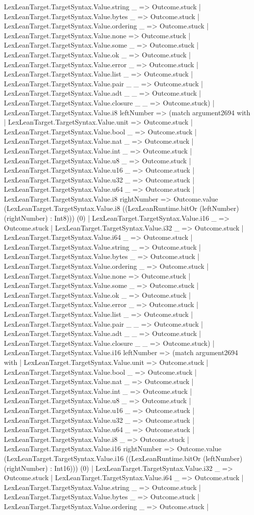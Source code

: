 \documentclass[11pt]{article}
\begin{document}
LexLeanTarget.TargetSyntax.Value.string \_ => Outcome.stuck | LexLeanTarget.TargetSyntax.Value.bytes \_ => Outcome.stuck | LexLeanTarget.TargetSyntax.Value.ordering \_ => Outcome.stuck | LexLeanTarget.TargetSyntax.Value.none => Outcome.stuck | LexLeanTarget.TargetSyntax.Value.some \_ => Outcome.stuck | LexLeanTarget.TargetSyntax.Value.ok \_ => Outcome.stuck | LexLeanTarget.TargetSyntax.Value.error \_ => Outcome.stuck | LexLeanTarget.TargetSyntax.Value.list \_ => Outcome.stuck | LexLeanTarget.TargetSyntax.Value.pair \_ \_ => Outcome.stuck | LexLeanTarget.TargetSyntax.Value.adt \_ \_ => Outcome.stuck | LexLeanTarget.TargetSyntax.Value.closure \_ \_ => Outcome.stuck) | LexLeanTarget.TargetSyntax.Value.i8 leftNumber => (match argument2694 with | LexLeanTarget.TargetSyntax.Value.unit => Outcome.stuck | LexLeanTarget.TargetSyntax.Value.bool \_ => Outcome.stuck | LexLeanTarget.TargetSyntax.Value.nat \_ => Outcome.stuck | LexLeanTarget.TargetSyntax.Value.int \_ => Outcome.stuck | LexLeanTarget.TargetSyntax.Value.u8 \_ => Outcome.stuck | LexLeanTarget.TargetSyntax.Value.u16 \_ => Outcome.stuck | LexLeanTarget.TargetSyntax.Value.u32 \_ => Outcome.stuck | LexLeanTarget.TargetSyntax.Value.u64 \_ => Outcome.stuck | LexLeanTarget.TargetSyntax.Value.i8 rightNumber => Outcome.value (LexLeanTarget.TargetSyntax.Value.i8 ((LexLeanRuntime.bitOr (leftNumber) (rightNumber) : Int8))) (0) | LexLeanTarget.TargetSyntax.Value.i16 \_ => Outcome.stuck | LexLeanTarget.TargetSyntax.Value.i32 \_ => Outcome.stuck | LexLeanTarget.TargetSyntax.Value.i64 \_ => Outcome.stuck | LexLeanTarget.TargetSyntax.Value.string \_ => Outcome.stuck | LexLeanTarget.TargetSyntax.Value.bytes \_ => Outcome.stuck | LexLeanTarget.TargetSyntax.Value.ordering \_ => Outcome.stuck | LexLeanTarget.TargetSyntax.Value.none => Outcome.stuck | LexLeanTarget.TargetSyntax.Value.some \_ => Outcome.stuck | LexLeanTarget.TargetSyntax.Value.ok \_ => Outcome.stuck | LexLeanTarget.TargetSyntax.Value.error \_ => Outcome.stuck | LexLeanTarget.TargetSyntax.Value.list \_ => Outcome.stuck | LexLeanTarget.TargetSyntax.Value.pair \_ \_ => Outcome.stuck | LexLeanTarget.TargetSyntax.Value.adt \_ \_ => Outcome.stuck | LexLeanTarget.TargetSyntax.Value.closure \_ \_ => Outcome.stuck) | LexLeanTarget.TargetSyntax.Value.i16 leftNumber => (match argument2694 with | LexLeanTarget.TargetSyntax.Value.unit => Outcome.stuck | LexLeanTarget.TargetSyntax.Value.bool \_ => Outcome.stuck | LexLeanTarget.TargetSyntax.Value.nat \_ => Outcome.stuck | LexLeanTarget.TargetSyntax.Value.int \_ => Outcome.stuck | LexLeanTarget.TargetSyntax.Value.u8 \_ => Outcome.stuck | LexLeanTarget.TargetSyntax.Value.u16 \_ => Outcome.stuck | LexLeanTarget.TargetSyntax.Value.u32 \_ => Outcome.stuck | LexLeanTarget.TargetSyntax.Value.u64 \_ => Outcome.stuck | LexLeanTarget.TargetSyntax.Value.i8 \_ => Outcome.stuck | LexLeanTarget.TargetSyntax.Value.i16 rightNumber => Outcome.value (LexLeanTarget.TargetSyntax.Value.i16 ((LexLeanRuntime.bitOr (leftNumber) (rightNumber) : Int16))) (0) | LexLeanTarget.TargetSyntax.Value.i32 \_ => Outcome.stuck | LexLeanTarget.TargetSyntax.Value.i64 \_ => Outcome.stuck | LexLeanTarget.TargetSyntax.Value.string \_ => Outcome.stuck | LexLeanTarget.TargetSyntax.Value.bytes \_ => Outcome.stuck | LexLeanTarget.TargetSyntax.Value.ordering \_ => Outcome.stuck | 
\end{document}
